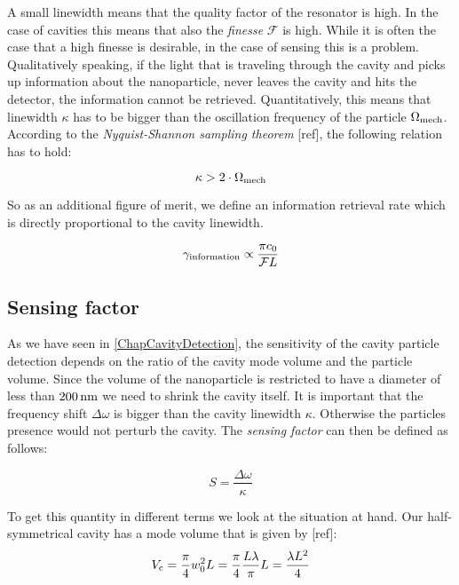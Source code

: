 A small linewidth means that the quality factor of the resonator is high. In the case of cavities this means that also the \textit{finesse} $\mathcal{F}$ is high. While it is often the case that a high finesse is desirable, in the case of sensing this is a problem. Qualitatively speaking, if the light that is traveling through the cavity and picks up information about the nanoparticle, never leaves the cavity and hits the detector, the information cannot be retrieved. Quantitatively, this means that linewidth $\kappa$ has to be bigger than the oscillation frequency of the particle $\de{\Omega}{mech}$. According to the \textit{Nyquist-Shannon sampling theorem} [ref], the following relation has to hold:

\begin{equation}
	\kappa > 2\cdot\de{\Omega}{mech}
\end{equation}

So as an additional figure of merit, we define an information retrieval rate which is directly proportional to the cavity linewidth.

\begin{equation}
	\de{\gamma}{information}\propto \frac{\pi c_0}{\mathcal{F}L}
\end{equation}

\subsection{Sensing factor}\label{ChapSensingFactor}
As we have seen in \autoref{ChapCavityDetection}, the sensitivity of the cavity particle detection depends on the ratio of the cavity mode volume and the particle volume. Since the volume of the nanoparticle is restricted to have a diameter of less than $200\nm$ we need to shrink the cavity itself. It is important that the frequency shift $\Delta\omega$ is bigger than the cavity linewidth $\kappa$. Otherwise the particles presence would not perturb the cavity. The \textit{sensing factor} can then be defined as follows:

\begin{equation}\label{EqS}
	S=\frac{\Delta\omega}{\kappa}
\end{equation}

To get this quantity in different terms we look at the situation at hand. Our half-symmetrical cavity has a mode volume that is given by [ref]:
\begin{equation}
	\de{V}{c}=\frac{\pi}{4}w_0^2L=\frac{\pi}{4}\frac{L\lambda}{\pi}L=\frac{\lambda L^2}{4}
\end{equation}

